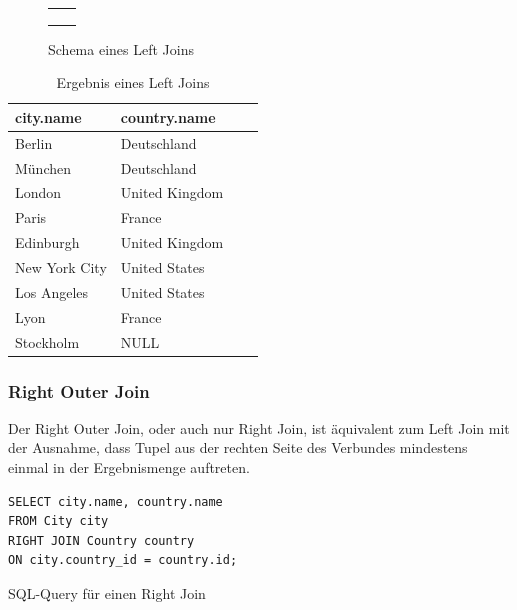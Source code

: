 \documentclass[a4paper]{article}
\begin{document}
\begin{minipage}{\textwidth}
\begin{minipage}[b]{0.49\textwidth}
\begin{figure}[H]
\begin{tabular}{| c | c |}
    \cellcolor{cell} & \cellcolor{cell-odd} \\ \hline
    \cellcolor{cell} & \cellcolor{cell-odd} \\ \hline
    \cellcolor{cell} & \cellcolor{cell-odd} \\ \hline
    \cellcolor{cell} & \\ \hline
  \end{tabular}
\caption{Schema eines Left Joins}
\end{figure}
\end{minipage}
\hfill
\begin{minipage}[b]{0.49\textwidth}
\begin{table}[H]
\centering
  \begin{tabular}{| l | l | l | l |}
    \hline
    city.name & country.name\\ \hline
    \hline
   Berlin & Deutschland \\ \hline
   München & Deutschland \\ \hline
   London & United Kingdom \\ \hline
   Paris & France \\ \hline
   Edinburgh & United Kingdom \\ \hline
   New York City & United States \\ \hline
   Los Angeles & United States \\ \hline
   Lyon & France \\ \hline
   Stockholm & NULL \\ \hline
  \end{tabular}
\caption{Ergebnis eines Left Joins}
\label{tab:left-join}
\end{table}
\end{minipage}
\end{minipage}

\newpage
\subsubsection{Right Outer Join}
\label{sec:right-join}
Der Right Outer Join, oder auch nur Right Join, ist äquivalent zum Left Join mit der Ausnahme, dass Tupel aus der rechten Seite des Verbundes mindestens einmal in der Ergebnismenge auftreten.

\begin{listing}[H]
\begin{verbatim}
SELECT city.name, country.name 
FROM City city
RIGHT JOIN Country country 
ON city.country_id = country.id;
\end{verbatim}
\caption{SQL-Query für einen Right Join}
\label{lst:right-join}
\end{listing}
\end{document}
